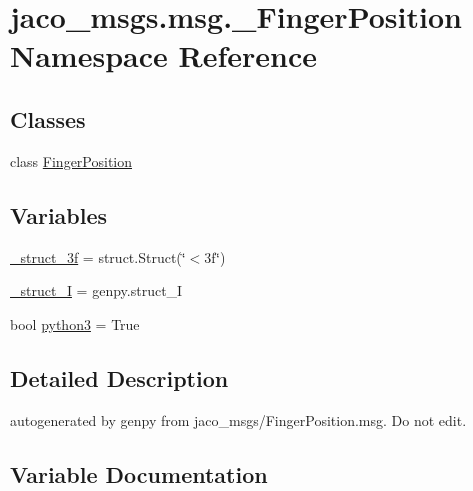 \hypertarget{namespacejaco__msgs_1_1msg_1_1__FingerPosition}{}\section{jaco\+\_\+msgs.\+msg.\+\_\+\+Finger\+Position Namespace Reference}
\label{namespacejaco__msgs_1_1msg_1_1__FingerPosition}
\subsection*{Classes}
\begin{DoxyCompactItemize}
\item 
class \hyperlink{classjaco__msgs_1_1msg_1_1__FingerPosition_1_1FingerPosition}{Finger\+Position}
\end{DoxyCompactItemize}
\subsection*{Variables}
\begin{DoxyCompactItemize}
\item 
\hyperlink{namespacejaco__msgs_1_1msg_1_1__FingerPosition_a36c80183c9f1d32d16d50d59c918177f}{\+\_\+struct\+\_\+3f} = struct.\+Struct(\char`\"{}$<$3f\char`\"{})
\item 
\hyperlink{namespacejaco__msgs_1_1msg_1_1__FingerPosition_ad0a1f6c9c5d75781dd2db6ce7438abab}{\+\_\+struct\+\_\+I} = genpy.\+struct\+\_\+I
\item 
bool \hyperlink{namespacejaco__msgs_1_1msg_1_1__FingerPosition_accd3c192713597e3be20319c54113739}{python3} = True
\end{DoxyCompactItemize}


\subsection{Detailed Description}
\begin{DoxyVerb}autogenerated by genpy from jaco_msgs/FingerPosition.msg. Do not edit.\end{DoxyVerb}
 

\subsection{Variable Documentation}
